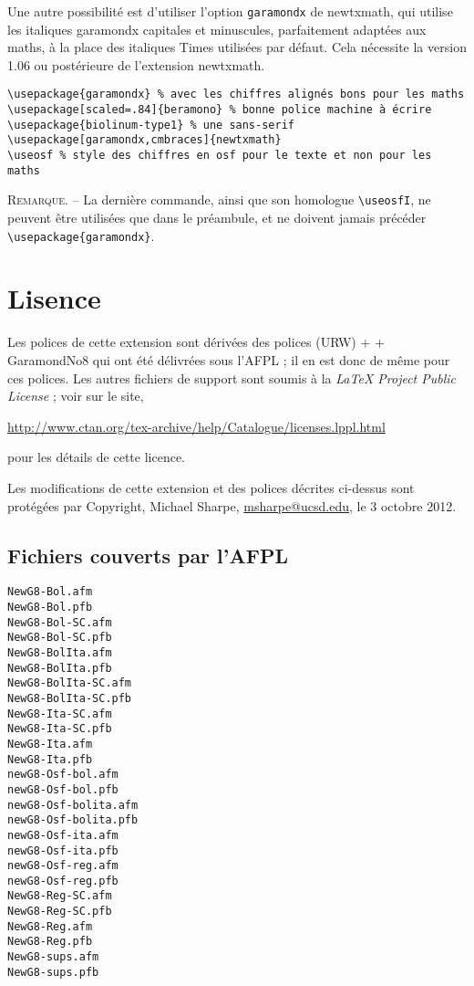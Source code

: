 \documentclass[12pt,english,french]{article}
\newcommand{\mnu}[1]{\textsf{#1}}
\newcommand{\cmd}[1]{\texttt{#1}}
\begin{document}
Une autre possibilité est d'utiliser l'option \cmd{garamondx} de \mnu{newtxmath}, qui utilise les italiques garamondx capitales et minuscules, parfaitement adaptées aux maths, à la place des italiques Times utilisées par défaut. Cela nécessite la version 1.06 ou postérieure de l'extension \mnu{newtxmath}.

\begin{verbatim}
\usepackage{garamondx} % avec les chiffres alignés bons pour les maths
\usepackage[scaled=.84]{beramono} % bonne police machine à écrire
\usepackage{biolinum-type1} % une sans-serif
\usepackage[garamondx,cmbraces]{newtxmath}
\useosf % style des chiffres en osf pour le texte et non pour les maths
\end{verbatim}

\noindent\textsc{Remarque}. -- La dernière commande, ainsi que son homologue \verb+\useosfI+, ne peuvent être utilisées que dans le préambule, et ne doivent jamais précéder \verb+\usepackage{garamondx}+.

\section{Lisence}

Les polices de cette extension sont dérivées des polices (URW) + + GaramondNo8 qui ont été délivrées sous l'AFPL ;  il en est donc de même pour ces polices. Les autres fichiers de support sont soumis à la \emph{\LaTeX{} Project Public License} ; voir sur le site,

\noindent\url{http://www.ctan.org/tex-archive/help/Catalogue/licenses.lppl.html}

\noindent pour les détails de cette licence.

Les modifications de cette extension et des polices décrites ci-dessus sont protégées par Copyright, Michael Sharpe, \href{mailto:msharpe@ucsd.edu}{msharpe@ucsd.edu}, le 3 octobre 2012.\enlargethispage*{\baselineskip}

\subsection{Fichiers couverts par l'AFPL}

\begin{verbatim}
NewG8-Bol.afm
NewG8-Bol.pfb
NewG8-Bol-SC.afm
NewG8-Bol-SC.pfb
NewG8-BolIta.afm
NewG8-BolIta.pfb
NewG8-BolIta-SC.afm
NewG8-BolIta-SC.pfb
NewG8-Ita-SC.afm
NewG8-Ita-SC.pfb
NewG8-Ita.afm
NewG8-Ita.pfb
newG8-Osf-bol.afm
newG8-Osf-bol.pfb
newG8-Osf-bolita.afm
newG8-Osf-bolita.pfb
newG8-Osf-ita.afm
newG8-Osf-ita.pfb
newG8-Osf-reg.afm
newG8-Osf-reg.pfb
NewG8-Reg-SC.afm
NewG8-Reg-SC.pfb
NewG8-Reg.afm
NewG8-Reg.pfb
NewG8-sups.afm
NewG8-sups.pfb
\end{verbatim}
\end{document}
